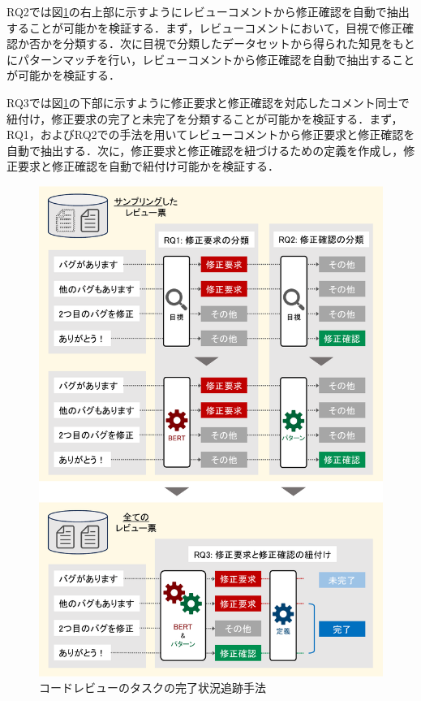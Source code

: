 \documentclass[11pt]{jreport}
\begin{document}
RQ2では図\ref{fig:research_method}の右上部に示すようにレビューコメントから修正確認を自動で抽出することが可能かを検証する．まず，レビューコメントにおいて，目視で修正確認か否かを分類する．次に目視で分類したデータセットから得られた知見をもとにパターンマッチを行い，レビューコメントから修正確認を自動で抽出することが可能かを検証する．

RQ3では図\ref{fig:research_method}の下部に示すように修正要求と修正確認を対応したコメント同士で紐付け，修正要求の完了と未完了を分類することが可能かを検証する．まず，RQ1，およびRQ2での手法を用いてレビューコメントから修正要求と修正確認を自動で抽出する．次に，修正要求と修正確認を紐づけるための定義を作成し，修正要求と修正確認を自動で紐付け可能かを検証する．

\begin{figure}[t]
\centerline{\includegraphics[width=1.00\linewidth]{@BSthesis2024_Kawasaki/BSthesis2024_Kawasaki_fig/research_method.pdf}}
\caption{コードレビューのタスクの完了状況追跡手法}
\label{fig:research_method}
\end{figure}
\end{document}
